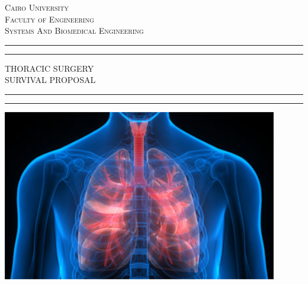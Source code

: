 \documentclass[a4paper, 11pt, oneside]{article} %
\begin{document}
 




\begin{titlepage} %




	\centering %
	
	\scshape %
	
	\vspace{0\baselineskip} %
	\vspace{0.5\baselineskip} %
	
	{\scshape\Large Cairo University\\ Faculty of Engineering\\Systems And Biomedical Engineering\\} %

	
	\rule{\textwidth}{1.6pt}\vspace*{-\baselineskip}\vspace*{2pt} %
	\rule{\textwidth}{0.4pt} %
	
	\vspace{0.75\baselineskip} %
	
	{\LARGE THORACIC   SURGERY\\ SURVIVAL PROPOSAL\\} %
	
	\vspace{0.75\baselineskip} %
	
	\rule{\textwidth}{0.4pt}\vspace*{-\baselineskip}\vspace{3.2pt} %
	\rule{\textwidth}{1.6pt} %
	
	\vspace{0\baselineskip} %

	\includegraphics[width=12cm, height=5 cm]{figures/Thoracic-Anesthesiology}
	

\end{titlepage}
\end{document}
